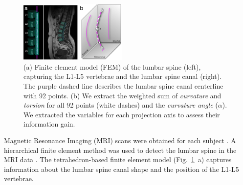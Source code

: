 \documentclass[a4paper,twoside]{style/article}
\begin{document}
\begin{figure}[!t]
  \centering
  \includegraphics[width=0.475\textwidth]{figures/centerline}
  \caption{
	(a) Finite element model (FEM) of the lumbar spine (left), capturing the L1-L5 vertebrae and the lumbar spine canal (right).
	The purple dashed line describes the lumbar spine canal centerline with 92 points.
	(b) We extract the weighted sum of \emph{curvature} and \emph{torsion} for all 92 points (white dashes) and the \emph{curvature angle} ($\alpha$). %
	We extracted the variables for each projection axis to assess their information gain.
	}
  \label{fig:centerline}
\end{figure}
Magnetic Resonance Imaging (MRI) scans were obtained for each subject \cite{Hegenscheid2013}.
A hierarchical finite element method was used to detect the lumbar spine in the MRI data \cite{Rak2013}.
The tetrahedron-based finite element model (Fig.~\ref{fig:centerline}~a) captures information about the lumbar spine canal shape and the position of the L1-L5 vertebrae.
\end{document}
